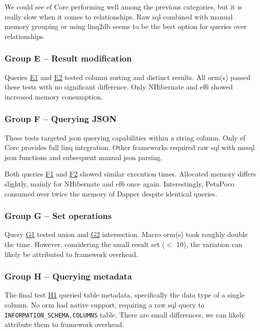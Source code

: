 We could see \acrshort{ef} Core performing well among the previous categories, but it is really slow when it comes to relationships. Raw \acrshort{sql} combined with manual memory grouping or using linq2db seems to be the best option for queries over relationships.

\subsubsection{Group E -- Result modification}
Queries \hyperref[query:e1]{E1} and \hyperref[query:e2]{E2} tested column sorting and distinct results. All \acrshort{orm}(s) passed these tests with no significant difference. Only NHibernate and \acrshort{ef}6 showed increased memory consumption. 

\subsubsection{Group F -- Querying JSON}
These tests targeted \acrshort{json} querying capabilities within a string column. Only \acrshort{ef} Core provides full \acrshort{linq} integration. Other frameworks required raw \acrshort{sql} with \acrshort{mssql} \acrshort{json} functions and subsequent manual \acrshort{json} parsing.

Both queries \hyperref[query:f1]{F1} and \hyperref[query:f2]{F2} showed similar execution times. Allocated memory differs slightly, mainly for NHibernate and \acrshort{ef}6 once again. Interestingly, PetaPoco consumed over twice the memory of Dapper despite identical queries.

\subsubsection{Group G -- Set operations}
Query \hyperref[query:g1]{G1} tested union and \hyperref[query:g2]{G2} intersection. Macro \acrshort{orm}(s) took roughly double the time. However, considering the small result set ($<$ 10), the variation can likely be attributed to framework overhead.

\subsubsection{Group H -- Querying metadata}
The final test \hyperref[query:h1]{H1} queried table metadata, specifically the data type of a single column. No \acrshort{orm} had native support, requiring a raw \acrshort{sql} query to \texttt{INFORMATION\_SCHEMA.COLUMNS} table. There are small differences, we can likely attribute them to framework overhead.

